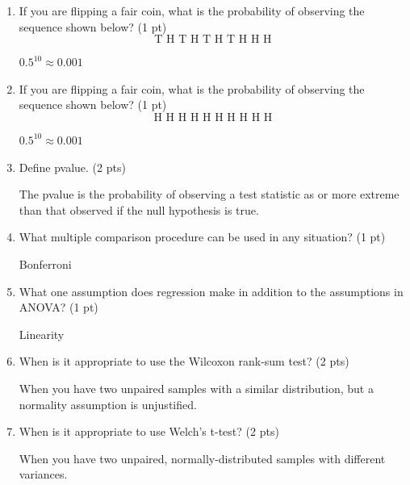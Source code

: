 \documentclass[10pt,draft]{article}
\newcommand{\bigbrk}{\vspace*{2in}}
\newcommand{\longcorrect}[2][\bigbrk]{{\color{red} #2}}
\newcommand{\longcorrect}[2][\bigbrk]{#1}
\begin{document}
\begin{enumerate}

\item If you are flipping a fair coin, what is the probability of observing the  sequence shown below? (1 pt)
\[ \mbox{T H T H T H T H H H} \]

\longcorrect[\vspace*{0.5in}]{$0.5^{10}\approx 0.001$}

\item If you are flipping a fair coin, what is the probability of observing the  sequence shown below? (1 pt)
\[ \mbox{H H H H H H H H H H} \]

\longcorrect[\vspace*{0.5in}]{$0.5^{10}\approx 0.001$}

\item Define pvalue. (2 pts)

\longcorrect[\vspace*{1in}]{The pvalue is the probability of observing a test statistic as or more extreme than that observed if the null hypothesis is true.}

\item What multiple comparison procedure can be used in any situation? (1 pt)

\longcorrect[\vspace*{0.5in}]{Bonferroni}

\item What one assumption does regression make in addition to the assumptions in ANOVA? (1 pt)

\longcorrect[\vspace*{0.5in}]{Linearity}

\item When is it appropriate to use the Wilcoxon rank-sum test? (2 pts)

\longcorrect[\vspace*{1.0in}]{When you have two unpaired samples with a similar distribution, but a normality assumption is unjustified.}

\item When is it appropriate to use Welch's t-test? (2 pts)

\longcorrect[\vspace*{0.8in}]{When you have two unpaired, normally-distributed samples with different variances.}

\end{enumerate}
\end{document}
